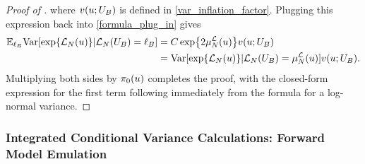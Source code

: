 \documentclass[12pt]{article}
\begin{document}
\begin{proof} [Proof of ]
where $\varInflation(\Par; \designBatchIn)$ is defined in \ref{var_inflation_factor}. Plugging this expression back 
into \ref{formula_plug_in} gives 
\begin{align*}
\E_{\designBatchLlik} \Var[\Exp{\llikEm(\Par)} | \llikEm[\Ndesign](\designBatchIn) = \designBatchLlik]
&= \cst \Exp{2\emMean[\Ndesign]{\llik}(\Par)} \varInflation(\Par; \designBatchIn) \\
&= \Var[\Exp{\llikEm(\Par)} | \llikEm[\Ndesign](\designBatchIn) = \emMean[\Ndesign]{\llik}(\Par)] \varInflation(\Par; \designBatchIn).
\end{align*}
Multiplying both sides by $\priorDens(\Par)$ completes the proof, with the closed-form expression for the first term following 
immediately from the formula for a log-normal variance. 
\end{proof}

\subsubsection{Integrated Conditional Variance Calculations: Forward Model Emulation}
\end{document}
